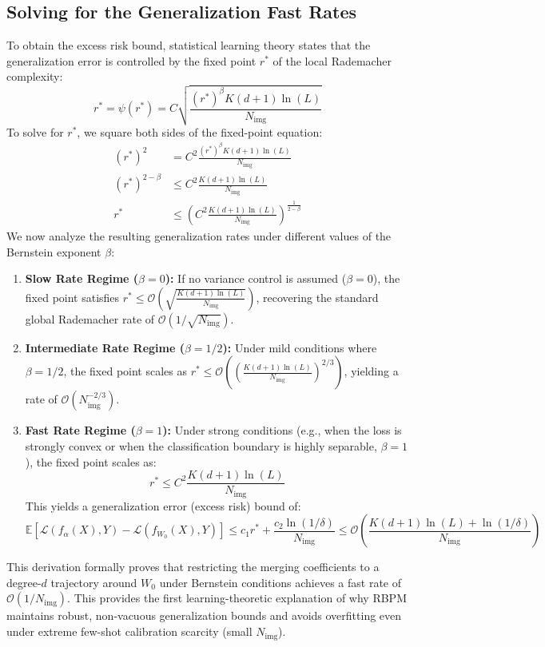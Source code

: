\documentclass{article}
\theoremstyle{plain}
\theoremstyle{definition}
\theoremstyle{remark}
\begin{document}
\subsection{Solving for the Generalization Fast Rates}
To obtain the excess risk bound, statistical learning theory states that the generalization error is controlled by the fixed point $r^*$ of the local Rademacher complexity:
\begin{equation}
r^* = \psi(r^*) = C \sqrt{\frac{(r^*)^\beta K(d+1) \ln(L)}{N_{\text{img}}}}
\end{equation}
To solve for $r^*$, we square both sides of the fixed-point equation:
\begin{align}
(r^*)^2 &= C^2 \frac{(r^*)^\beta K(d+1) \ln(L)}{N_{\text{img}}} \\
(r^*)^{2-\beta} &\le C^2 \frac{K(d+1) \ln(L)}{N_{\text{img}}} \\
r^* &\le \left( C^2 \frac{K(d+1) \ln(L)}{N_{\text{img}}} \right)^{\frac{1}{2-\beta}}
\end{align}
We now analyze the resulting generalization rates under different values of the Bernstein exponent $\beta$:
\begin{enumerate}
    \item \textbf{Slow Rate Regime ($\beta = 0$):} If no variance control is assumed ($\beta = 0$), the fixed point satisfies $r^* \le \mathcal{O}\left( \sqrt{\frac{K(d+1) \ln(L)}{N_{\text{img}}}} \right)$, recovering the standard global Rademacher rate of $\mathcal{O}(1/\sqrt{N_{\text{img}}})$.
    \item \textbf{Intermediate Rate Regime ($\beta = 1/2$):} Under mild conditions where $\beta = 1/2$, the fixed point scales as $r^* \le \mathcal{O}\left( \left(\frac{K(d+1) \ln(L)}{N_{\text{img}}}\right)^{2/3} \right)$, yielding a rate of $\mathcal{O}(N_{\text{img}}^{-2/3})$.
    \item \textbf{Fast Rate Regime ($\beta = 1$):} Under strong conditions (e.g., when the loss is strongly convex or when the classification boundary is highly separable, $\beta = 1$), the fixed point scales as:
    \begin{equation}
    r^* \le C^2 \frac{K(d+1) \ln(L)}{N_{\text{img}}}
    \end{equation}
    This yields a generalization error (excess risk) bound of:
    \begin{equation}
    \mathbb{E} \left[ \mathcal{L}(f_{\alpha}(X), Y) - \mathcal{L}(f_{W_0}(X), Y) \right] \le c_1 r^* + \frac{c_2 \ln(1/\delta)}{N_{\text{img}}} \le \mathcal{O}\left( \frac{K(d+1) \ln(L) + \ln(1/\delta)}{N_{\text{img}}} \right)
    \end{equation}
\end{enumerate}
This derivation formally proves that restricting the merging coefficients to a degree-$d$ trajectory around $W_0$ under Bernstein conditions achieves a fast rate of $\mathcal{O}(1/N_{\text{img}})$. This provides the first learning-theoretic explanation of why RBPM maintains robust, non-vacuous generalization bounds and avoids overfitting even under extreme few-shot calibration scarcity (small $N_{\text{img}}$).
\end{document}
